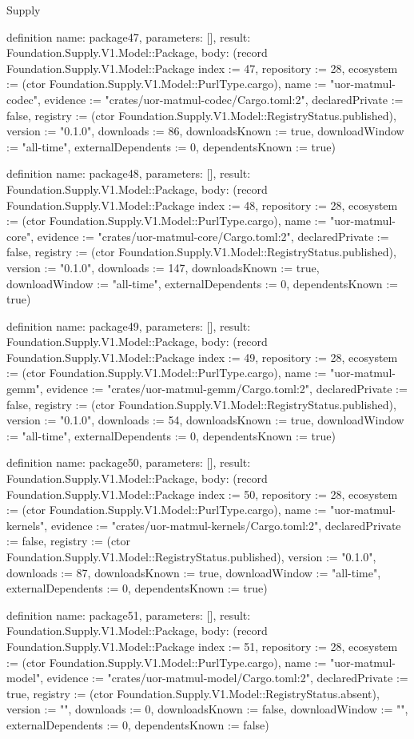 \begin{lexlean}{Supply}
\begin{semanticmodule}
definition{
  name: package47,
  parameters: [],
  result: Foundation.Supply.V1.Model::Package,
  body: (record Foundation.Supply.V1.Model::Package {index := 47, repository := 28, ecosystem := (ctor Foundation.Supply.V1.Model::PurlType.cargo), name := "uor-matmul-codec", evidence := "crates/uor-matmul-codec/Cargo.toml:2", declaredPrivate := false, registry := (ctor Foundation.Supply.V1.Model::RegistryStatus.published), version := "0.1.0", downloads := 86, downloadsKnown := true, downloadWindow := "all-time", externalDependents := 0, dependentsKnown := true})
}

definition{
  name: package48,
  parameters: [],
  result: Foundation.Supply.V1.Model::Package,
  body: (record Foundation.Supply.V1.Model::Package {index := 48, repository := 28, ecosystem := (ctor Foundation.Supply.V1.Model::PurlType.cargo), name := "uor-matmul-core", evidence := "crates/uor-matmul-core/Cargo.toml:2", declaredPrivate := false, registry := (ctor Foundation.Supply.V1.Model::RegistryStatus.published), version := "0.1.0", downloads := 147, downloadsKnown := true, downloadWindow := "all-time", externalDependents := 0, dependentsKnown := true})
}

definition{
  name: package49,
  parameters: [],
  result: Foundation.Supply.V1.Model::Package,
  body: (record Foundation.Supply.V1.Model::Package {index := 49, repository := 28, ecosystem := (ctor Foundation.Supply.V1.Model::PurlType.cargo), name := "uor-matmul-gemm", evidence := "crates/uor-matmul-gemm/Cargo.toml:2", declaredPrivate := false, registry := (ctor Foundation.Supply.V1.Model::RegistryStatus.published), version := "0.1.0", downloads := 54, downloadsKnown := true, downloadWindow := "all-time", externalDependents := 0, dependentsKnown := true})
}

definition{
  name: package50,
  parameters: [],
  result: Foundation.Supply.V1.Model::Package,
  body: (record Foundation.Supply.V1.Model::Package {index := 50, repository := 28, ecosystem := (ctor Foundation.Supply.V1.Model::PurlType.cargo), name := "uor-matmul-kernels", evidence := "crates/uor-matmul-kernels/Cargo.toml:2", declaredPrivate := false, registry := (ctor Foundation.Supply.V1.Model::RegistryStatus.published), version := "0.1.0", downloads := 87, downloadsKnown := true, downloadWindow := "all-time", externalDependents := 0, dependentsKnown := true})
}

definition{
  name: package51,
  parameters: [],
  result: Foundation.Supply.V1.Model::Package,
  body: (record Foundation.Supply.V1.Model::Package {index := 51, repository := 28, ecosystem := (ctor Foundation.Supply.V1.Model::PurlType.cargo), name := "uor-matmul-model", evidence := "crates/uor-matmul-model/Cargo.toml:2", declaredPrivate := true, registry := (ctor Foundation.Supply.V1.Model::RegistryStatus.absent), version := "", downloads := 0, downloadsKnown := false, downloadWindow := "", externalDependents := 0, dependentsKnown := false})
}


\end{semanticmodule}
\end{lexlean}
